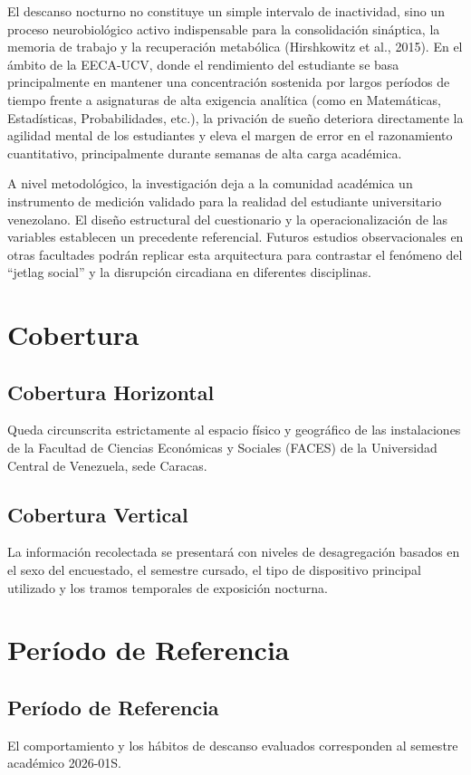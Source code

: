\documentclass[12pt, letterpaper]{article}
\begin{document}
El descanso nocturno no constituye un simple intervalo de inactividad, sino un proceso neurobiológico activo indispensable para la consolidación sináptica, la memoria de trabajo y la recuperación metabólica (Hirshkowitz et al., 2015). En el ámbito de la EECA-UCV, donde el rendimiento del estudiante se basa principalmente en mantener una concentración sostenida por largos períodos de tiempo frente a asignaturas de alta exigencia analítica (como en Matemáticas, Estadísticas, Probabilidades, etc.), la privación de sueño deteriora directamente la agilidad mental de los estudiantes y eleva el margen de error en el razonamiento cuantitativo, principalmente durante semanas de alta carga académica.

A nivel metodológico, la investigación deja a la comunidad académica un instrumento de medición validado para la realidad del estudiante universitario venezolano. El diseño estructural del cuestionario y la operacionalización de las variables establecen un precedente referencial. Futuros estudios observacionales en otras facultades podrán replicar esta arquitectura para contrastar el fenómeno del ``jetlag social'' y la disrupción circadiana en diferentes disciplinas.


\section{Cobertura}

\subsection{Cobertura Horizontal}
Queda circunscrita estrictamente al espacio físico y geográfico de las instalaciones de la Facultad de Ciencias Económicas y Sociales (FACES) de la Universidad Central de Venezuela, sede Caracas.

\subsection{Cobertura Vertical}
La información recolectada se presentará con niveles de desagregación basados en el sexo del encuestado, el semestre cursado, el tipo de dispositivo principal utilizado y los tramos temporales de exposición nocturna.


\section{Período de Referencia}

\subsection{Período de Referencia}
El comportamiento y los hábitos de descanso evaluados corresponden al semestre académico 2026-01S.
\end{document}
